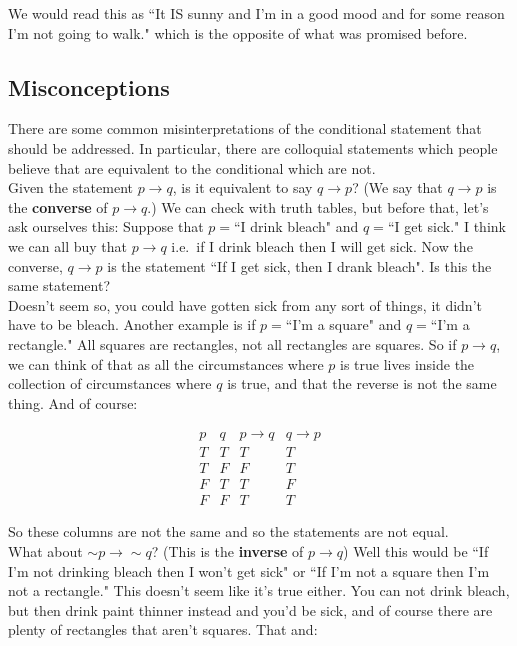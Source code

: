 We would read this as ``It IS sunny and I'm in a good mood and for some reason I'm not going to walk." which is the opposite of what was promised before.


\subsection{Misconceptions}

There are some common misinterpretations of the conditional statement that should be addressed.  In particular, there are colloquial statements which people believe that are equivalent to the conditional which are not.\\

Given the statement $p\to q$, is it equivalent to say $q\to p$?  (We say that $q\to p$ is the \textbf{converse} of $p\to q$.)  We can check with truth tables, but before that, let's ask ourselves this:  Suppose that $p=$``I drink bleach" and $q=$``I get sick."  I think we can all buy that $p\to q$ i.e.\ if I drink bleach then I will get sick.  Now the converse, $q\to p$ is the statement ``If I get sick, then I drank bleach".  Is this the same statement?\\

Doesn't seem so, you could have gotten sick from any sort of things, it didn't have to be bleach.  Another example is if $p=$``I'm a square" and $q=$``I'm a rectangle."  All squares are rectangles, not all rectangles are squares.  So if $p\to q$, we can think of that as all the circumstances where $p$ is true lives inside the collection of circumstances where $q$ is true, and that the reverse is not the same thing.  And of course:

$$\begin{array}{c|c|c|c}
p & q & p\to q & q\to p\\
\hline
T & T & T & T\\
T & F & F & T\\
F & T & T & F \\
F & F & T & T
\end{array}$$


So these columns are not the same and so the statements are not equal.\\

What about $\sim p \to \sim q$? (This is the  \textbf{inverse} of $p\to q$)  Well this would be ``If I'm not drinking bleach then I won't get sick" or ``If I'm not a square then I'm not a rectangle."  This doesn't seem like it's true either.  You can not drink bleach, but then drink paint thinner instead and you'd be sick, and of course there are plenty of rectangles that aren't squares.  That and:

